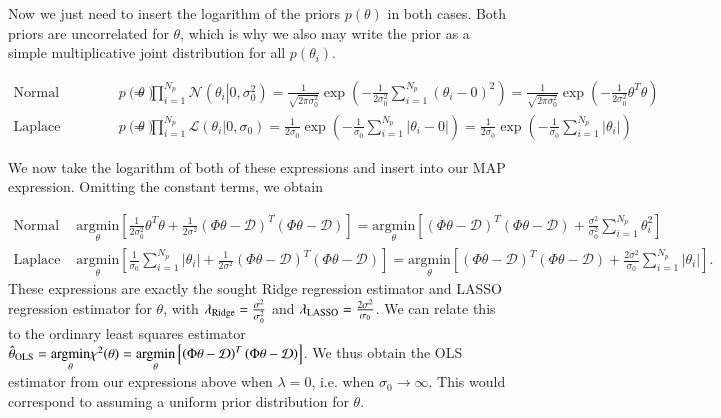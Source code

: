 \documentclass[11pt,a4paper]{article}
\begin{document}
Now we just need to insert the logarithm of the priors $p(\theta)$ in both cases. Both priors are uncorrelated for $\theta$, which is why we also may write the prior as a simple multiplicative joint distribution for all $p(\theta_i)$.

\begin{align*}
    \text{Normal parameter prior: } p(\theta) &= \prod_{i=1}^{N_p} \mathcal{N}(\theta_i \left\vert\right. 0, \sigma_0^2) = \frac{1}{\sqrt{2\pi\sigma_0^2}} \exp\left({{- \frac{1}{2\sigma_0^2}\sum_{i=1}^{N_p} \left(\theta_i - 0\right)^2}}\right) = \frac{1}{\sqrt{2\pi\sigma_0^2}} \exp\left( -\frac{1}{2\sigma_0^2} \theta^T\theta \right) \\
    \text{Laplace parameter prior: } p(\theta) &= \prod_{i=1}^{N_p} \mathcal{L}(\theta_i \left\vert\right. 0, \sigma_0) = \frac{1}{2\sigma_0} \exp\left(- \frac{1}{\sigma_0}\sum_{i=1}^{N_p} \left\vert\theta_i - 0\right\vert \right) = \frac{1}{2\sigma_0} \exp\left(- \frac{1}{\sigma_0}\sum_{i=1}^{N_p} \left\vert\theta_i\right\vert \right)
\end{align*}

We now take the logarithm of both of these expressions and insert into our MAP expression. Omitting the constant terms, we obtain

\begin{align*}
    \text{Normal prior: } &\underset{\theta}{\mathrm{argmin}} \left[ \frac{1}{2\sigma_0^2}\theta^T\theta  + \frac{1}{2\sigma^2} \left(\Phi \theta -  \mathcal{D} \right)^T\left(\Phi \theta -  \mathcal{D} \right) \right] = \underset{\theta}{\mathrm{argmin}} \left[ \left(\Phi \theta -  \mathcal{D} \right)^T\left(\Phi \theta -  \mathcal{D} \right) + \frac{\sigma^2}{\sigma_0^2}\sum_{i=1}^{N_p} \theta_i^2  \right]  \\
    \text{Laplace prior: } &\underset{\theta}{\mathrm{argmin}} \left[ \frac{1}{\sigma_0}\sum_{i=1}^{N_p} \left\vert\theta_i\right\vert + \frac{1}{2\sigma^2} \left(\Phi \theta -  \mathcal{D} \right)^T\left(\Phi \theta -  \mathcal{D} \right) \right] = \underset{\theta}{\mathrm{argmin}} \left[ \left(\Phi \theta -  \mathcal{D} \right)^T\left(\Phi \theta -  \mathcal{D} \right) + \frac{2\sigma^2}{\sigma_0}\sum_{i=1}^{N_p} \left\vert\theta_i\right\vert  \right].
\end{align*}
These expressions are exactly the sought Ridge regression estimator and LASSO regression estimator for $\theta$, with $\lambda_{\rm Ridge} = \frac{\sigma^2}{\sigma_0^2}$ and $\lambda_{\rm LASSO} = \frac{2\sigma^2}{\sigma_0}$.
We can relate this to the ordinary least squares estimator $\hat{\theta}_{\rm OLS} = \underset{\theta}{\mathrm{argmin}} \chi^2(\theta) = \underset{\theta}{\mathrm{argmin}} \left[ \left(\Phi \theta -  \mathcal{D} \right)^T\left(\Phi \theta -  \mathcal{D} \right) \right]$. We thus obtain the OLS estimator from our expressions above when $\lambda=0$, i.e. when $\sigma_0 \rightarrow \infty$. This would correspond to assuming a uniform prior distribution for $\theta$.
\end{document}

